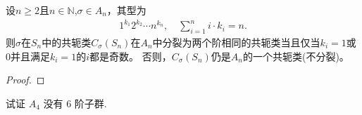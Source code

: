 \documentclass[../../main.tex]{subfiles}%
\begin{document}
\begin{theorem}\label{theorem:交错群共轭类计算的分裂定理}
设$n\geqslant 2$且$n\in \mathbb{N}$,$\sigma \in A_n$，其型为
\begin{align*}
1^{k_1}2^{k_2}\cdots n^{k_n},\quad \sum\limits_{i=1}^n{i\cdot k_i}=n.
\end{align*}
则$\sigma$在$S_n$中的共轭类$C_{\sigma}(S_n)$在$A_n$中分裂为两个阶相同的共轭类当且仅当$k_i=1$或$0$并且满足$k_i=1$的$i$都是奇数。
否则，$C_{\sigma}(S_n)$仍是$A_n$的一个共轭类(不分裂)。
\end{theorem}
\begin{proof}



\end{proof}

\begin{example}\label{example:A4的正规子群的计算}
试证 $A_4$ 没有 6 阶子群.
\end{example}
\end{document}
